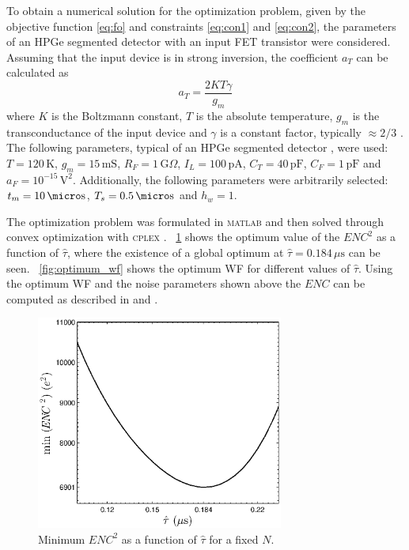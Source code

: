 To obtain a numerical solution for the optimization problem, given by the objective function \eqref{eq:fo} and constraints \eqref{eq:con1} and \eqref{eq:con2}, the parameters of an HPGe segmented detector with an input FET transistor were considered. Assuming that the input device is in strong inversion, the coefficient $a_T$ can be calculated as
	\begin{equation} 
		a_T = \frac{2 K T \gamma}{g_m}
	\end{equation}
where $K$ is the Boltzmann constant, $T$ is the absolute temperature, $g_m$ is the transconductance of the input device and $\gamma$ is a constant factor, typically $\approx 2/3$ \citep{van101}. The following parameters, typical of an HPGe segmented detector \citep{pullia102}, were used: $T = 120\,\text{K}$, $g_m = 15\,\text{mS}$, $R_F = 1\, \text{G}\Omega$, $I_L = 100\,\text{pA}$, $C_T = 40\,\text{pF}$, $C_F = 1\,\text{pF}$ and $a_F = 10^{-15}\,\text{V}^2$. Additionally, the following parameters were arbitrarily selected: $t_m = 10\,\micro \text{s}$, $T_s = 0.5\,\micro\text{s}$ and $h_w = 1$.

The optimization problem was formulated in \textsc{matlab} and then solved through convex optimization with \textsc{cplex} \citep{cplex}. \figurename~\ref{fig:optimum_tau} shows the optimum value of the $\mathit{ENC}^2$ as a function of $\hat{\tau}$, where the existence of a global optimum at $\hat{\tau} =0.184\,\mu\text{s}$ can be seen. \figurename~\ref{fig:optimum_wf} shows the optimum WF for different values of $\hat{\tau}$. Using the optimum WF and the noise parameters shown above the $\mathit{ENC}$ can be computed as described in \citep{gatti101} and \citep{pullia104}.

\begin{figure}[!t]
	\centering
	\includegraphics[width=3.2in]{./Figures/optimum_tau.eps}
	\caption{Minimum $\mathit{ENC}^2$ as a function of $\hat{\tau}$ for a fixed $N$.}\label{fig:optimum_tau}
\end{figure}

